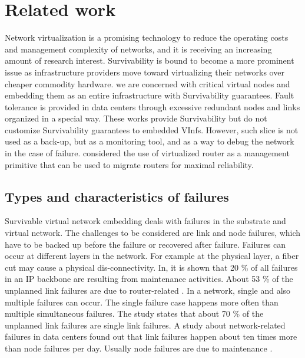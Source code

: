 \section{Related work}
Network virtualization is a promising technology to reduce the operating costs and management complexity of networks, and it is receiving an increasing amount of research interest\cite{chowdhury2009network}. Survivability is bound to become a more prominent issue as infrastructure providers move toward virtualizing their networks over cheaper commodity hardware\cite{bhatia2008trellis}. we are concerned with critical virtual nodes and embedding them as an entire infrastructure with Survivability guarantees. Fault tolerance is provided in data centers \cite{guo2009bcube} through excessive redundant nodes and links organized in a special way. These works provide Survivability but do not customize Survivability guarantees to embedded VInfs. However, such slice is not used as a back-up, but as a monitoring tool, and as a way to debug
the network in the case of failure.\cite{wang2008virtual} considered the use
of virtualized router as a management primitive that can be used to migrate routers for maximal reliability.

\subsection{Types and characteristics of failures} Survivable virtual
network embedding deals with failures in the substrate and
virtual network. The challenges to be considered are link and
node failures, which have to be backed up before the failure
or recovered after failure. Failures can occur at different layers
in the network. For example at the physical layer, a fiber cut
may cause a physical dis-connectivity. In\cite{markopoulou2004characterization}, it is shown
that 20 \% of all failures in an IP backbone are resulting from
maintenance activities. About 53 \% of the unplanned link
failures are due to router-related \cite{markopoulou2004characterization}. In a network, single
and also multiple failures can occur. The single failure case
happens more often than multiple simultaneous failures. The
study \cite{markopoulou2004characterization} states that about 70 \% of the unplanned link failures
are single link failures. A study \cite{gill2011understanding} about network-related
failures in data centers found out that link failures happen
about ten times more than node failures per day. Usually node
failures are due to maintenance \cite{gill2011understanding}.

